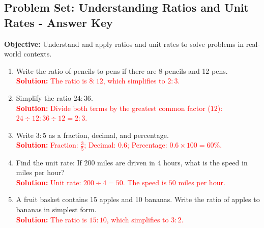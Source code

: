 \documentclass[12pt]{article}
\title{}
\date{}
\begin{document}
\subsection*{Problem Set: Understanding Ratios and Unit Rates - Answer Key}
\onehalfspacing

\begin{tcolorbox}[colframe=black!40, colback=gray!5, 
coltitle=black, colbacktitle=black!20, fonttitle=\bfseries\Large, 
title=Learning Objective, halign title=center, left=5pt, right=5pt, top=5pt, bottom=15pt]
\textbf{Objective:} Understand and apply ratios and unit rates to solve problems in real-world contexts.
\end{tcolorbox}

\begin{tcolorbox}[colframe=black!60, colback=white, 
coltitle=black, colbacktitle=black!15, fonttitle=\bfseries\Large, 
title=Exercises, halign title=center, left=10pt, right=10pt, top=10pt, bottom=60pt]
\begin{enumerate}[itemsep=1.35em]
    \item Write the ratio of pencils to pens if there are 8 pencils and 12 pens.\\
    \textcolor{red}{\textbf{Solution:} The ratio is \(8:12\), which simplifies to \(2:3\).}

    \item Simplify the ratio \(24:36\).\\
    \textcolor{red}{\textbf{Solution:} Divide both terms by the greatest common factor (\(12\)): \(24 \div 12 : 36 \div 12 = 2:3\).}

    \item Write \(3:5\) as a fraction, decimal, and percentage.\\
    \textcolor{red}{\textbf{Solution:} Fraction: \(\frac{3}{5}\); Decimal: \(0.6\); Percentage: \(0.6 \times 100 = 60\%\).}

    \item Find the unit rate: If 200 miles are driven in 4 hours, what is the speed in miles per hour?\\
    \textcolor{red}{\textbf{Solution:} Unit rate: \(200 \div 4 = 50\). The speed is \(50\) miles per hour.}

    \item A fruit basket contains 15 apples and 10 bananas. Write the ratio of apples to bananas in simplest form.\\
    \textcolor{red}{\textbf{Solution:} The ratio is \(15:10\), which simplifies to \(3:2\).}


\end{enumerate}
\end{tcolorbox}
\end{document}
